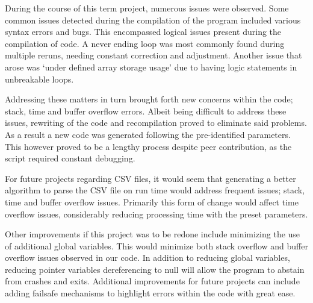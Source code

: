 

{During the course of this term project, numerous issues were observed. Some common issues detected during the compilation of the program included various syntax errors and bugs. This encompassed logical issues present during the compilation of code. A never ending loop was most commonly found during multiple reruns, needing constant correction and adjustment. Another issue that arose was ‘under defined array storage usage’ due to having logic statements in unbreakable loops.}

{Addressing these matters in turn brought forth new concerns within the code; stack, time and buffer overflow errors. Albeit being difficult to address these issues, rewriting of the code and recompilation proved to eliminate said problems.  As a result a new code was generated following the pre-identified parameters. This however proved to be a lengthy process despite peer contribution, as the script required constant debugging. }

{For future projects regarding CSV files, it would seem that generating a better algorithm to parse the CSV file on run time would address frequent issues; stack, time and buffer overflow issues. Primarily this form of change would affect time overflow issues, considerably reducing processing time with the preset parameters.}

{Other improvements if this project was to be redone include minimizing the use of additional global variables. This would minimize both stack overflow and buffer overflow issues observed in our code. In addition to reducing global variables, reducing pointer variables dereferencing to null will allow the program to abstain from crashes and exits. Additional improvements for future projects can include adding failsafe mechanisms to highlight errors within the code with great ease.}

{}

{}

{}

{}

{}

{}

{}


